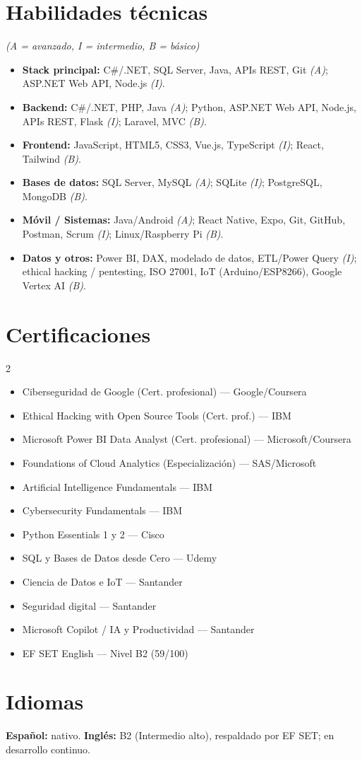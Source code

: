 \documentclass[10pt,a4paper]{article}
\begin{document}
\section{Habilidades técnicas} \textit{\small (A = avanzado, I = intermedio, B = básico)}
\begin{itemize}
  \item \textbf{Stack principal:} C\#/.NET, SQL Server, Java, APIs REST, Git \textit{(A)}; ASP.NET Web API, Node.js \textit{(I)}.
  \item \textbf{Backend:} C\#/.NET, PHP, Java \textit{(A)}; Python, ASP.NET Web API, Node.js, APIs REST, Flask \textit{(I)}; Laravel, MVC \textit{(B)}.
  \item \textbf{Frontend:} JavaScript, HTML5, CSS3, Vue.js, TypeScript \textit{(I)}; React, Tailwind \textit{(B)}.
  \item \textbf{Bases de datos:} SQL Server, MySQL \textit{(A)}; SQLite \textit{(I)}; PostgreSQL, MongoDB \textit{(B)}.
  \item \textbf{Móvil / Sistemas:} Java/Android \textit{(A)}; React Native, Expo, Git, GitHub, Postman, Scrum \textit{(I)}; Linux/Raspberry Pi \textit{(B)}.
  \item \textbf{Datos y otros:} Power BI, DAX, modelado de datos, ETL/Power Query \textit{(I)}; ethical hacking / pentesting, ISO 27001, IoT (Arduino/ESP8266), Google Vertex AI \textit{(B)}.
\end{itemize}

\section{Certificaciones}
{\small
\begin{multicols}{2}
\begin{itemize}
  \item Ciberseguridad de Google (Cert. profesional) --- Google/Coursera
  \item Ethical Hacking with Open Source Tools (Cert. prof.) --- IBM
  \item Microsoft Power BI Data Analyst (Cert. profesional) --- Microsoft/Coursera
  \item Foundations of Cloud Analytics (Especialización) --- SAS/Microsoft
  \item Artificial Intelligence Fundamentals --- IBM
  \item Cybersecurity Fundamentals --- IBM
  \item Python Essentials 1 y 2 --- Cisco
  \item SQL y Bases de Datos desde Cero --- Udemy
  \item Ciencia de Datos e IoT --- Santander
  \item Seguridad digital --- Santander
  \item Microsoft Copilot / IA y Productividad --- Santander
  \item EF SET English --- Nivel B2 (59/100)
\end{itemize}
\end{multicols}}

\section{Idiomas}
\textbf{Español:} nativo. \qquad \textbf{Inglés:} B2 (Intermedio alto), respaldado por EF SET; en desarrollo continuo.
\end{document}
